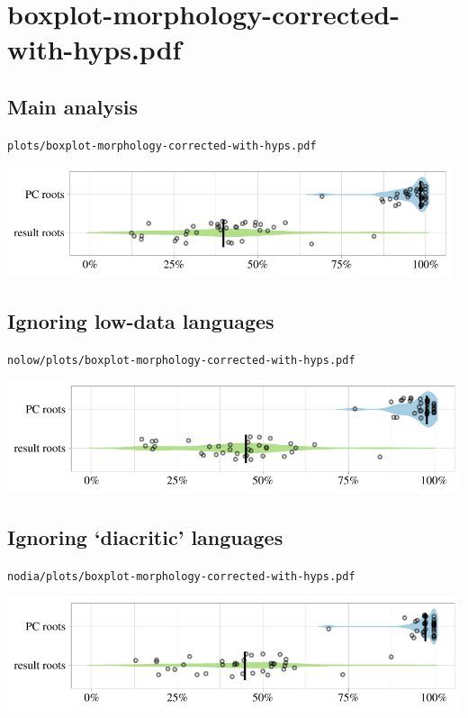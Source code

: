 \eject

\section{boxplot-morphology-corrected-with-hyps.pdf}

\subsection{Main analysis}

\texttt{plots/boxplot-morphology-corrected-with-hyps.pdf}

\includegraphics[width=0.98\textwidth]{../plots/boxplot-morphology-corrected-with-hyps.pdf}

\subsection{Ignoring low-data languages}

\texttt{nolow/plots/boxplot-morphology-corrected-with-hyps.pdf}

\includegraphics[width=1.0\textwidth]{../nolow/plots/boxplot-morphology-corrected-with-hyps.pdf}

\subsection{Ignoring `diacritic' languages}

\texttt{nodia/plots/boxplot-morphology-corrected-with-hyps.pdf}

\includegraphics[width=1.0\textwidth]{../nodia/plots/boxplot-morphology-corrected-with-hyps.pdf}

